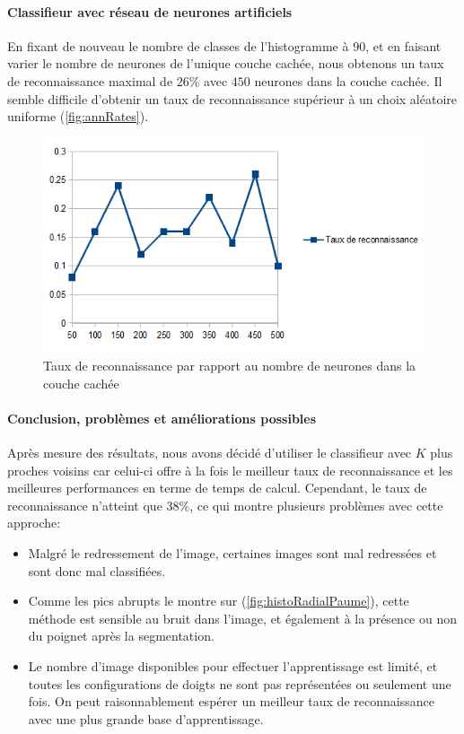 \paragraph{Classifieur avec réseau de neurones artificiels}
En fixant de nouveau le nombre de classes de l'histogramme à $90$, et en faisant varier le nombre de neurones de l'unique couche cachée, nous obtenons un taux de reconnaissance maximal de $26$\%  avec $450$ neurones dans la couche cachée. Il semble difficile d'obtenir un taux de reconnaissance supérieur à un choix aléatoire uniforme (\autoref{fig:annRates}).

\begin{figure}[htb!]
\centerline{\includegraphics[scale=0.8]{ANNRates.png}}
\caption{Taux de reconnaissance par rapport au nombre de neurones dans la couche cachée}
\label{fig:annRates}
\end{figure}

\paragraph{Conclusion, problèmes et améliorations possibles}
Après mesure des résultats, nous avons décidé d'utiliser le classifieur avec $K$ plus proches voisins car celui-ci offre à la fois le meilleur taux de reconnaissance et les meilleures performances en terme de temps de calcul. Cependant, le taux de reconnaissance n'atteint que 38\%, ce qui montre plusieurs problèmes avec cette approche:
\begin{itemize}
\item Malgré le redressement de l'image, certaines images sont mal redressées et sont donc mal classifiées.
\item Comme les pics abrupts le montre sur (\autoref{fig:histoRadialPaume}), cette méthode est sensible au bruit dans l'image, et également à la présence ou non du poignet après la segmentation.
\item Le nombre d'image disponibles pour effectuer l'apprentissage est limité, et toutes les configurations de doigts ne sont pas représentées ou seulement une fois. On peut raisonnablement espérer un meilleur taux de reconnaissance avec une plus grande base d'apprentissage.
\end{itemize}